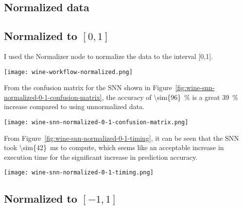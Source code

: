 \documentclass[
  coursecode={CMPE 251},
  assignmentname={Exercise \exercisenumber},
  studentnumber=20053722,
  name={Bryan Hoang},
  final,
]{
  ltxanswer%
}
\begin{document}
\begin{questions}
\begin{solution}
      \newpage

      \section*{Normalized data}
      \subsection*{Normalized to \([0,1]\)}
      I used the Normalizer node to normalize the data to the interval [0,1].

      \begin{answerfigure}
        \texttt{[image: wine-workflow-normalized.png]}
        \label{fig:wine-workflow-normalized}
      \end{answerfigure}

      From the confusion matrix for the SNN shown in Figure~\ref{fig:wine-snn-normalized-0-1-confusion-matrix}, the accuracy of \qty{\sim{96}}{\percent} is a great \qty{39}{\percent} increase compared to using unnormalized data.

      \begin{answerfigure}
        \texttt{[image: wine-snn-normalized-0-1-confusion-matrix.png]}
        \label{fig:wine-snn-normalized-0-1-confusion-matrix}
      \end{answerfigure}

      From Figure~\ref{fig:wine-snn-normalized-0-1-timing}, it can be seen that the SNN took \qty{\sim{42}}{\ms} to compute, which seems like an acceptable increase in execution time for the significant increase in prediction accuracy.

      \newpage

      \begin{answerfigure}
        \texttt{[image: wine-snn-normalized-0-1-timing.png]}
        \label{fig:wine-snn-normalized-0-1-timing}
      \end{answerfigure}

      \newpage

      \subsection*{Normalized to \([-1,1]\)}


\end{solution}
\end{questions}
\end{document}
